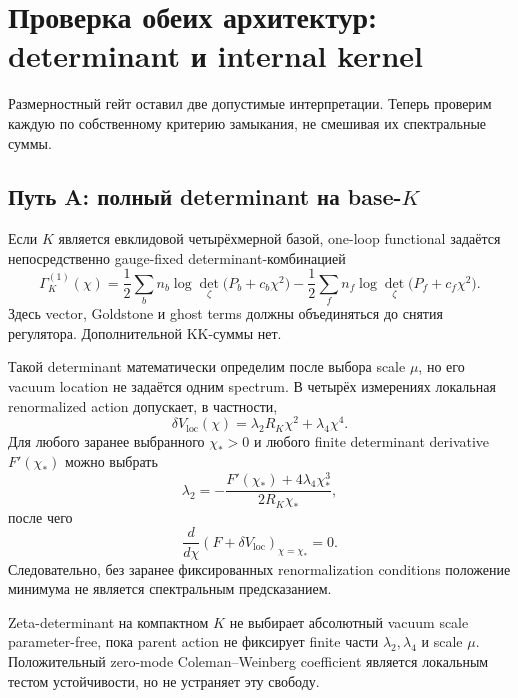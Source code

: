 \chapter{Проверка обеих архитектур: determinant и internal kernel}

Размерностный гейт оставил две допустимые интерпретации. Теперь проверим
каждую по собственному критерию замыкания, не смешивая их спектральные
суммы.

\section{Путь A: полный determinant на base-\(K\)}

Если \(K\) является евклидовой четырёхмерной базой, one-loop functional
задаётся непосредственно gauge-fixed determinant-комбинацией
\begin{equation}
 \Gamma_K^{(1)}(\chi)
 =
 \frac12\sum_b n_b\log\det_\zeta
 \bigl(P_b+c_b\chi^2\bigr)
 -
 \frac12\sum_f n_f\log\det_\zeta
 \bigl(P_f+c_f\chi^2\bigr).
\end{equation}
Здесь vector, Goldstone и ghost terms должны объединяться до снятия
регулятора. Дополнительной KK-суммы нет.

Такой determinant математически определим после выбора scale \(\mu\), но
его vacuum location не задаётся одним spectrum. В четырёх измерениях
локальная renormalized action допускает, в частности,
\begin{equation}
 \delta V_{\mathrm{loc}}(\chi)
 =\lambda_2R_K\chi^2+\lambda_4\chi^4.
\end{equation}
Для любого заранее выбранного \(\chi_* >0\) и любого finite determinant
derivative \(F'(\chi_*)\) можно выбрать
\begin{equation}
 \lambda_2
 =-\frac{F'(\chi_*)+4\lambda_4\chi_*^3}
 {2R_K\chi_*},
\end{equation}
после чего
\begin{equation}
 \frac{d}{d\chi}
 \left(F+\delta V_{\mathrm{loc}}\right)_{\chi=\chi_*}=0.
\end{equation}
Следовательно, без заранее фиксированных renormalization conditions
положение минимума не является спектральным предсказанием.

\begin{nogocriterion}
Zeta-determinant на компактном \(K\) не выбирает абсолютный vacuum scale
parameter-free, пока parent action не фиксирует finite части
\(\lambda_2,\lambda_4\) и scale \(\mu\). Положительный zero-mode
Coleman--Weinberg coefficient является локальным тестом устойчивости, но
не устраняет эту свободу.
\end{nogocriterion}

